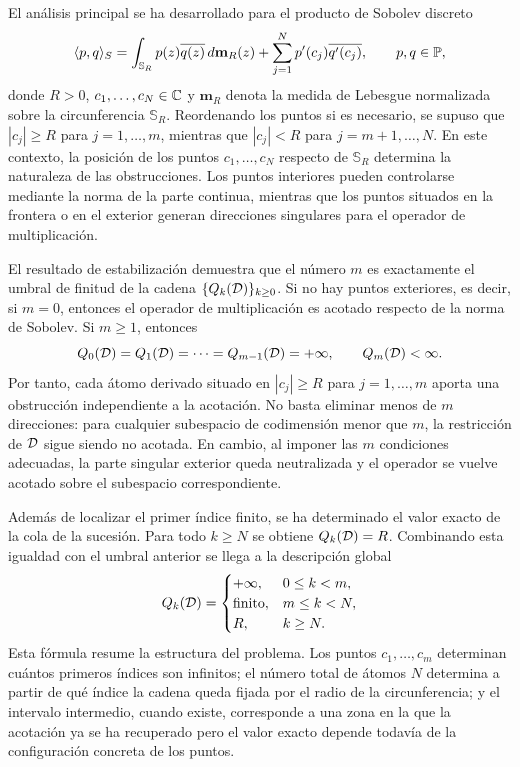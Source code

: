 El análisis principal se ha desarrollado para el producto de Sobolev discreto
\[
	\langle p,q\rangle_S
	=
	\int_{\mathbb{S}_R}p(z)\overline{q(z)}\,d\mathbf{m}_R(z)
	+
	\sum_{j=1}^N p'(c_j)\overline{q'(c_j)},
	\qquad p,q\in\mathbb{P},
\]
donde \(R>0\), \(c_1,\dots,c_N\in\mathbb{C}\) y \(\mathbf{m}_R\) denota la medida de
Lebesgue normalizada sobre la circunferencia \(\mathbb{S}_R\). Reordenando los
puntos si es necesario, se supuso que \(|c_j|\ge R\) para \(j=1,\dots,m\),
mientras que \(|c_j|<R\) para \(j=m+1,\dots,N\).
En este contexto, la posición de los puntos \(c_1,\dots,c_N\) respecto de \(\mathbb{S}_R\) determina la naturaleza
de las obstrucciones. Los puntos interiores pueden controlarse mediante la norma
de la parte continua, mientras que los puntos situados en la frontera o en el
exterior generan direcciones singulares para el operador de multiplicación.

El resultado de estabilización demuestra que el número
\(m\) es exactamente el umbral de finitud de la cadena \(\{Q_k(\mathcal{D})\}_{k\ge0}\). Si
no hay puntos exteriores, es decir, si \(m=0\), entonces el operador de
multiplicación es acotado respecto de la norma de Sobolev. Si \(m\ge1\), entonces
\[
	Q_0(\mathcal{D})=Q_1(\mathcal{D})=\cdots=Q_{m-1}(\mathcal{D})=+\infty,
	\qquad
	Q_m(\mathcal{D})<\infty.
\]
Por tanto, cada átomo derivado situado en \(|c_j|\ge R\) para \(j=1,\dots,m\) aporta una obstrucción
independiente a la acotación. No basta eliminar menos de \(m\) direcciones: para
cualquier subespacio de codimensión menor que \(m\), la restricción de \(\mathcal{D}\)
sigue siendo no acotada. En cambio, al imponer las \(m\) condiciones adecuadas,
la parte singular exterior queda neutralizada y el operador se vuelve acotado
sobre el subespacio correspondiente.

Además de localizar el primer índice finito, se ha determinado el valor exacto de
la cola de la sucesión. Para todo \(k\ge N\) se obtiene \(Q_k(\mathcal{D})=R\).
Combinando esta igualdad con el umbral anterior se llega a la descripción global
\[
	Q_k(\mathcal{D})=
	\begin{cases}
		+\infty,       & 0\le k<m, \\
		\text{finito}, & m\le k<N, \\
		R,             & k\ge N.
	\end{cases}
\]
Esta fórmula resume la estructura del problema. Los puntos \(c_1,\dots,c_m\)
determinan cuántos primeros índices son infinitos; el número total de átomos
\(N\) determina a partir de qué índice la cadena queda fijada por el radio de la
circunferencia; y el intervalo intermedio, cuando existe, corresponde a una zona
en la que la acotación ya se ha recuperado pero el valor exacto depende todavía de
la configuración concreta de los puntos.

